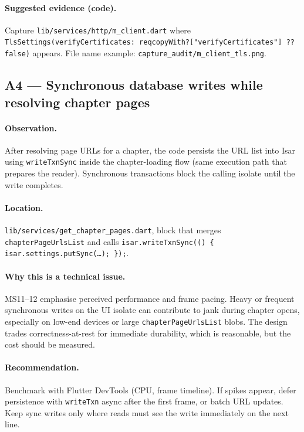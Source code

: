 \paragraph{Suggested evidence (code).}
Capture \texttt{lib/services/http/m\_client.dart} where \texttt{TlsSettings(verifyCertificates: reqcopyWith?["verifyCertificates"] ?? false)} appears. File name example: \texttt{capture\_audit/m\_client\_tls.png}.

\subsection*{A4 --- Synchronous database writes while resolving chapter pages}
\paragraph{Observation.}
After resolving page URLs for a chapter, the code persists the URL list into Isar using \texttt{writeTxnSync} inside the chapter-loading flow (same execution path that prepares the reader). Synchronous transactions block the calling isolate until the write completes.

\paragraph{Location.}
\texttt{lib/services/get\_chapter\_pages.dart}, block that merges \texttt{chapterPageUrlsList} and calls \texttt{isar.writeTxnSync(() \{ isar.settings.putSync(\ldots); \});}.

\paragraph{Why this is a technical issue.}
MS11--12 emphasise perceived performance and frame pacing. Heavy or frequent synchronous writes on the UI isolate can contribute to jank during chapter opens, especially on low-end devices or large \texttt{chapterPageUrlsList} blobs. The design trades correctness-at-rest for immediate durability, which is reasonable, but the cost should be measured.

\paragraph{Recommendation.}
Benchmark with Flutter DevTools (CPU, frame timeline). If spikes appear, defer persistence with \texttt{writeTxn} async after the first frame, or batch URL updates. Keep sync writes only where reads must see the write immediately on the next line.


